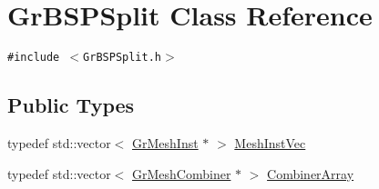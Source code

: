 \hypertarget{class_gr_b_s_p_split}{
\section{GrBSPSplit Class Reference}
\label{class_gr_b_s_p_split}
}
{\tt \#include $<$GrBSPSplit.h$>$}

\subsection*{Public Types}
\begin{CompactItemize}
\item 
typedef std::vector$<$ \hyperlink{class_gr_mesh_inst}{GrMeshInst} $\ast$ $>$ \hyperlink{class_gr_b_s_p_split_0d83e2da4ca339cbb2bb2060b2bec99b}{MeshInstVec}
\item 
typedef std::vector$<$ \hyperlink{class_gr_mesh_combiner}{GrMeshCombiner} $\ast$ $>$ \hyperlink{class_gr_b_s_p_split_c43b3da58545a4586d6a7a451f5935af}{CombinerArray}
\end{CompactItemize}
